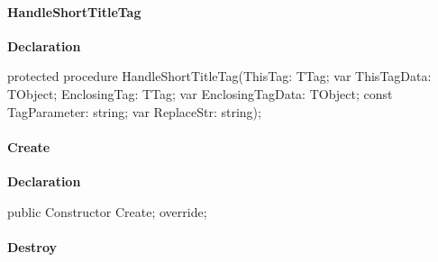 \documentclass{report}
\newif\ifpdf
\begin{document}
\paragraph*{HandleShortTitleTag}\hspace*{\fill}

\label{PasDoc_Items.TExternalItem-HandleShortTitleTag}
\begin{list}{}{
\setlength{\itemindent}{0cm}
\setlength{\listparindent}{0cm}
\setlength{\leftmargin}{\evensidemargin}
\addtolength{\leftmargin}{\tmplength}
\settowidth{\labelsep}{X}
\addtolength{\leftmargin}{\labelsep}
\setlength{\labelwidth}{\tmplength}
}
\item[\textbf{Declaration}\hfill]
\ifpdf
\begin{flushleft}
\fi
\begin{ttfamily}
protected procedure HandleShortTitleTag(ThisTag: TTag; var ThisTagData: TObject; EnclosingTag: TTag; var EnclosingTagData: TObject; const TagParameter: string; var ReplaceStr: string);\end{ttfamily}

\ifpdf
\end{flushleft}
\fi

\end{list}
\paragraph*{Create}\hspace*{\fill}

\label{PasDoc_Items.TExternalItem-Create}
\begin{list}{}{
\setlength{\itemindent}{0cm}
\setlength{\listparindent}{0cm}
\setlength{\leftmargin}{\evensidemargin}
\addtolength{\leftmargin}{\tmplength}
\settowidth{\labelsep}{X}
\addtolength{\leftmargin}{\labelsep}
\setlength{\labelwidth}{\tmplength}
}
\item[\textbf{Declaration}\hfill]
\ifpdf
\begin{flushleft}
\fi
\begin{ttfamily}
public Constructor Create; override;\end{ttfamily}

\ifpdf
\end{flushleft}
\fi

\end{list}
\paragraph*{Destroy}\hspace*{\fill}
\end{document}
